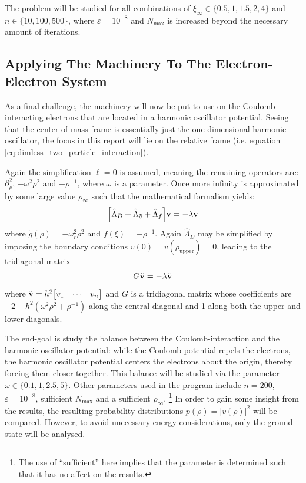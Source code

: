 \documentclass[reprint,english]{revtex4-1}
\begin{document}
The problem will be studied for all combinations of \(\xi_\infty\in\{0.5,1,1.5,2,4\}\) and \(n\in\{10,100,500\}\), where \(\varepsilon=10^{-8}\) and \(N_\text{max}\) is increased beyond the necessary amount of iterations. 
\subsection{Applying The Machinery To The Electron-Electron System}
As a final challenge, the machinery will now be put to use on the Coulomb-interacting electrons that are located in a harmonic oscillator potential. Seeing that the center-of-mass frame is essentially just the one-dimensional harmonic oscillator, the focus in this report will lie on the relative frame (i.e. equation \eqref{eq:dimless_two_particle_interaction}).

Again the simplification \(\ell=0\) is assumed, meaning the remaining operators are: \(\partial_\rho^2\), \(-\omega^2\rho^2\) and \(-\rho^{-1}\), where \(\omega\) is a parameter. Once more infinity is approximated by some large value \(\rho_\infty\) such that the mathematical formalism yields:
\begin{equation}\label{eq:discrete_dimless_interacting_electrons}
\Big[\hat{\Lambda}_D+\hat{\Lambda}_{\tilde{g}}+\hat{\Lambda}_f\Big]\vb{v}=-\lambda\vb{v}
\end{equation}
where \(\tilde{g}(\rho)=-\omega_r^2\rho^2\) and \(f(\xi)=-\rho^{-1}\). Again \(\hat{\Lambda}_D\) may be simplified by imposing the boundary conditions \(v(0)=v(\rho_\text{upper})=0\), leading to the tridiagonal matrix
\begin{equation}\label{eq:method:interacting_electrons}
G\tilde{\vb{v}}=-\lambda\tilde{\vb{v}}
\end{equation}
where \(\tilde{\vb{v}}=h^2\mqty[v_1&\cdots&v_n]\) and \(G\) is a tridiagonal matrix whose coefficients are \(-2-h^2(\omega^2\rho^2+\rho^{-1})\) along the central diagonal and 1 along both the upper and lower diagonals.

The end-goal is study the balance between the Coulomb-interaction and the harmonic oscillator potential: while the Coulomb potential repels the electrons, the harmonic oscillator potential centers the electrons about the origin, thereby forcing them closer together. This balance will be studied via the parameter \(\omega\in\{0.1,1,2.5,5\}\). Other parameters used in the program include \(n=200\), \(\varepsilon=10^{-8}\), sufficient \(N_\text{max}\) and a sufficient \(\rho_\infty\). \footnote{The use of ``sufficient'' here implies that the parameter is determined such that it has no affect on the results.} In order to gain some insight from the results, the resulting probability distributions \(p(\rho)=|v(\rho)|^2\) will be compared. However, to avoid unecessary energy-considerations, only the ground state will be analysed.
\end{document}

